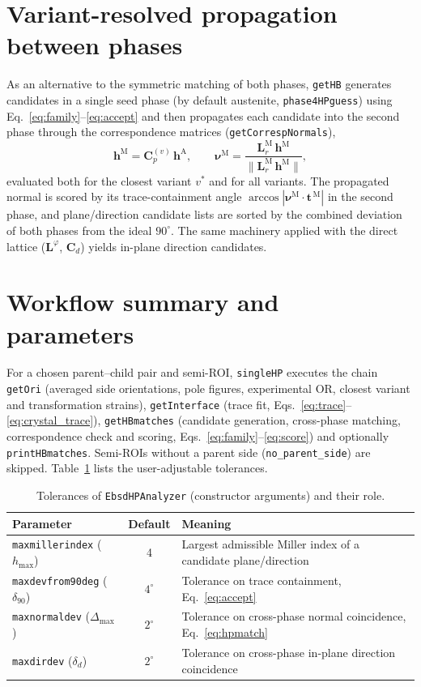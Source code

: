 \documentclass[11pt,a4paper]{article}
\newcommand{\mat}[1]{\mathbf{#1}}
\newcommand{\vc}[1]{\bm{#1}}
\begin{document}
\section{Variant-resolved propagation between phases}

As an alternative to the symmetric matching of both phases, \texttt{getHB} generates candidates in a single seed phase (by default austenite, \texttt{phase4HPguess}) using Eq.~\eqref{eq:family}--\eqref{eq:accept} and then propagates each candidate into the second phase through the correspondence matrices (\texttt{getCorrespNormals}),
\begin{equation}
\vc h^{\mathrm M}=\mat C_p^{(v)}\,\vc h^{\mathrm A},
\qquad
\vc\nu^{\mathrm M}=\frac{\mat L_{r}^{\mathrm M}\,\vc h^{\mathrm M}}{\lVert \mat L_{r}^{\mathrm M}\,\vc h^{\mathrm M}\rVert},
\label{eq:propagate}
\end{equation}
evaluated both for the closest variant $v^\ast$ and for all variants. The propagated normal is scored by its trace-containment angle $\arccos|\vc\nu^{\mathrm M}\cdot\vc t^{\,\mathrm M}|$ in the second phase, and plane/direction candidate lists are sorted by the combined deviation of both phases from the ideal $90^\circ$. The same machinery applied with the direct lattice ($\mat L^{\varphi}$, $\mat C_d$) yields in-plane direction candidates.

\section{Workflow summary and parameters}

For a chosen parent--child pair and semi-ROI, \texttt{singleHP} executes the chain \texttt{getOri} (averaged side orientations, pole figures, experimental OR, closest variant and transformation strains), \texttt{getInterface} (trace fit, Eqs.~\eqref{eq:trace}--\eqref{eq:crystal_trace}), \texttt{getHBmatches} (candidate generation, cross-phase matching, correspondence check and scoring, Eqs.~\eqref{eq:family}--\eqref{eq:score}) and optionally \texttt{printHBmatches}. Semi-ROIs without a parent side (\texttt{no\_parent\_side}) are skipped. Table~\ref{tab:params} lists the user-adjustable tolerances.

\begin{table}[ht]
\centering
\caption{Tolerances of \texttt{EbsdHPAnalyzer} (constructor arguments) and their role.}
\label{tab:params}
\begin{tabular}{lcl}
\toprule
Parameter & Default & Meaning \\
\midrule
\texttt{maxmillerindex} ($h_{\max}$) & 4 & Largest admissible Miller index of a candidate plane/direction \\
\texttt{maxdevfrom90deg} ($\delta_{90}$) & $4^\circ$ & Tolerance on trace containment, Eq.~\eqref{eq:accept} \\
\texttt{maxnormaldev} ($\Delta_{\max}$) & $2^\circ$ & Tolerance on cross-phase normal coincidence, Eq.~\eqref{eq:hpmatch} \\
\texttt{maxdirdev} ($\delta_d$) & $2^\circ$ & Tolerance on cross-phase in-plane direction coincidence \\
\bottomrule
\end{tabular}
\end{table}
\end{document}
